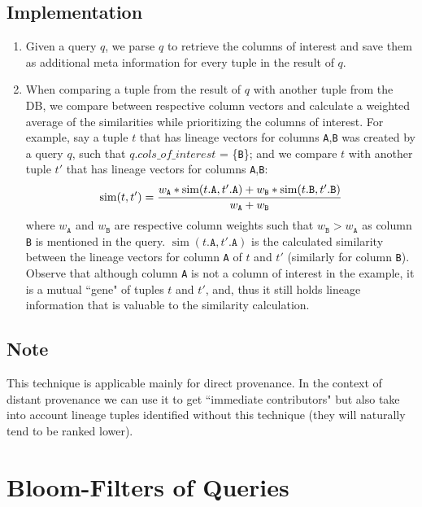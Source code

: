 \subsection{Implementation} 
\begin{enumerate}
    \item Given a query $q$, we parse $q$ to retrieve the columns of interest and save them as additional meta information for every tuple in the result of $q$.
    \item When comparing a tuple from the result of $q$ with another tuple from the DB, we compare between respective column vectors and calculate a weighted average of the similarities while prioritizing the columns of interest. For example, say a tuple $t$ that has lineage vectors for columns \texttt{A},\texttt{B} was created by a query $q$, such that $q.cols\_of\_interest$ = \{\texttt{B}\}; and we compare $t$ with another tuple $t'$ that has lineage vectors for columns \texttt{A},\texttt{B}:\\
    \begin{equation*}
        \operatorname{sim}(t, t') = \frac{w_\texttt{A}*\operatorname{sim}(t.\texttt{A}, t'.\texttt{A}) +
        w_\texttt{B}*\operatorname{sim}(t.\texttt{B}, t'.\texttt{B})}{w_\texttt{A} + w_\texttt{B}}\\
    \end{equation*}
    where $w_\texttt{A}$ and $w_\texttt{B}$ are respective column weights such that $w_\texttt{B} > w_\texttt{A}$ as column \texttt{B} is mentioned in the query. $\operatorname{sim}(t.\texttt{A}, t'.\texttt{A})$ is the calculated similarity between the lineage vectors for column \texttt{A} of $t$ and $t'$ (similarly for column \texttt{B}). Observe that although column \texttt{A} is not a column of interest in the example, it is a mutual ``gene" of tuples $t$ and $t'$, and, thus it still holds lineage information that is valuable to the similarity calculation.
\end{enumerate}

\subsection{Note} This technique is applicable mainly for direct provenance. In the context of distant provenance we can use it to get ``immediate contributors" but also take into account lineage tuples identified without this technique (they will naturally tend to be ranked lower).
 


\section{Bloom-Filters of Queries}\label{sec:bloom-filters}
